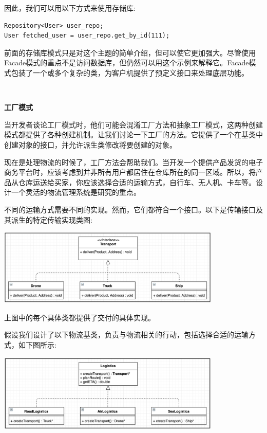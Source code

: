 因此，我们可以用以下方式来使用存储库: \par

\begin{lstlisting}[caption={}]
Repository<User> user_repo;
User fetched_user = user_repo.get_by_id(111);
\end{lstlisting}

前面的存储库模式只是对这个主题的简单介绍，但可以使它更加强大。尽管使用Facade模式的重点不是访问数据库，但仍然可以用这个示例来解释它。Facade模式包装了一个或多个复杂的类，为客户机提供了预定义接口来处理底层功能。 \par

\noindent\textbf{}\ \par
\textbf{工厂模式} \ \par
当开发者谈论工厂模式时，他们可能会混淆工厂方法和抽象工厂模式，这两种创建模式都提供了各种创建机制。让我们讨论一下工厂的方法。它提供了一个在基类中创建对象的接口，并允许派生类修改将要创建的对象。 \par
现在是处理物流的时候了，工厂方法会帮助我们。当开发一个提供产品发货的电子商务平台时，应该考虑到并非所有用户都居住在仓库所在的同一区域。所以，将产品从仓库运送给买家，你应该选择合适的运输方式，自行车、无人机、卡车等。设计一个灵活的物流管理系统是研究的重点。 \par
不同的运输方式需要不同的实现。然而，它们都符合一个接口。以下是传输接口及其派生的特定传输实现类图: \par

\begin{center}
	\includegraphics[width=0.8\textwidth]{content/Section-2/Chapter-10/11}
\end{center}

上图中的每个具体类都提供了交付的具体实现。 \par
假设我们设计了以下物流基类，负责与物流相关的行动，包括选择合适的运输方式，如下图所示: \par

\begin{center}
	\includegraphics[width=0.8\textwidth]{content/Section-2/Chapter-10/12}
\end{center}

